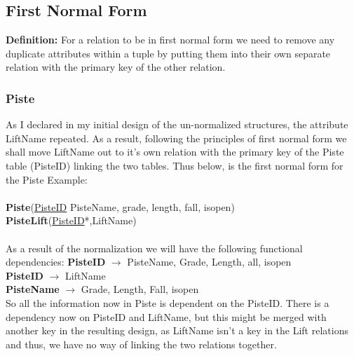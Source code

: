 \documentclass[12pt]{article}
\begin{document}
{\subsection{First Normal Form}
\textbf{Definition:} For a relation to be in first normal form 	we need to remove any duplicate attributes within a tuple by putting them into their own separate relation with the primary key of the other relation.	
\subsubsection{Piste}
As I declared in my initial design of the un-normalized structures, the attribute LiftName repeated. As a result, following the principles of first normal form we shall move LiftName out to it's own relation with the primary key of the Piste table (PisteID) linking the two tables. Thus below, is the first normal form for the Piste Example:~\\\\
\-\hspace{1.8cm}\textbf{Piste}(\uline{PisteID} PisteName, grade, length, fall, isopen)~\\
\-\hspace{1.8cm}\textbf{PisteLift}(\uline{PisteID}*,LiftName)~\\\\
As a result of the normalization we will have the following functional dependencies:
\-\hspace{1.8cm}\textbf{PisteID} $\rightarrow$ PisteName, Grade, Length, all, isopen~\\
\-\hspace{1.8cm}\textbf{PisteID} $\rightarrow$ LiftName ~\\
\-\hspace{1.8cm}\textbf{PisteName} $\rightarrow$ Grade, Length, Fall, isopen~\\
So all the information now in Piste is dependent on the PisteID. There is a dependency now on PisteID and LiftName, but this might be merged with another key in the resulting design, as LiftName isn't a key in the Lift relations and thus, we have no way of linking the two relations together.
}
\end{document}
